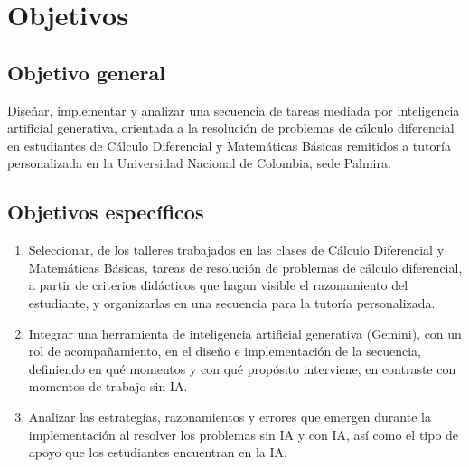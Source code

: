 
\section{Objetivos}

\subsection{Objetivo general}

Diseñar, implementar y analizar una secuencia de tareas mediada por inteligencia artificial generativa, orientada a la resolución de problemas de cálculo diferencial en estudiantes de Cálculo Diferencial y Matemáticas Básicas remitidos a tutoría personalizada en la Universidad Nacional de Colombia, sede Palmira.

\subsection{Objetivos específicos}

\begin{enumerate}

    \item Seleccionar, de los talleres trabajados en las clases de Cálculo Diferencial y Matemáticas Básicas, tareas de resolución de problemas de cálculo diferencial, a partir de criterios didácticos que hagan visible el razonamiento del estudiante, y organizarlas en una secuencia para la tutoría personalizada.

    \item Integrar una herramienta de inteligencia artificial generativa (Gemini), con un rol de acompañamiento, en el diseño e implementación de la secuencia, definiendo en qué momentos y con qué propósito interviene, en contraste con momentos de trabajo sin IA.

    \item Analizar las estrategias, razonamientos y errores que emergen durante la implementación al resolver los problemas sin IA y con IA, así como el tipo de apoyo que los estudiantes encuentran en la IA.
\end{enumerate}
